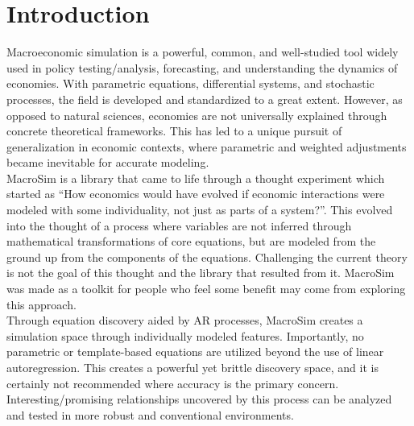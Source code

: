 

\section{Introduction}\label{sec:introduction}
    Macroeconomic simulation is a powerful, common, and well-studied tool widely used in policy testing/analysis, forecasting, and understanding the dynamics of economies.
With parametric equations, differential systems, and stochastic processes, the field is developed and standardized to a great extent.
However, as opposed to natural sciences, economies are not universally explained through concrete theoretical frameworks.
This has led to a unique pursuit of generalization in economic contexts, where parametric and weighted adjustments became inevitable for accurate modeling.
    \\

    MacroSim is a library that came to life through a thought experiment which started as ``How economics would have evolved if economic interactions were modeled with some individuality, not just as parts of a system?''.
This evolved into the thought of a process where variables are not inferred through mathematical transformations of core equations, but are modeled from the ground up from the components of the equations.
Challenging the current theory is not the goal of this thought and the library that resulted from it.
MacroSim was made as a toolkit for people who feel some benefit may come from exploring this approach.
    \\

    Through equation discovery aided by AR processes, MacroSim creates a simulation space through individually modeled features.
Importantly, no parametric or template-based equations are utilized beyond the use of linear autoregression.
This creates a powerful yet brittle discovery space, and it is certainly not recommended where accuracy is the primary concern.
Interesting/promising relationships uncovered by this process can be analyzed and tested in more robust and conventional environments.
